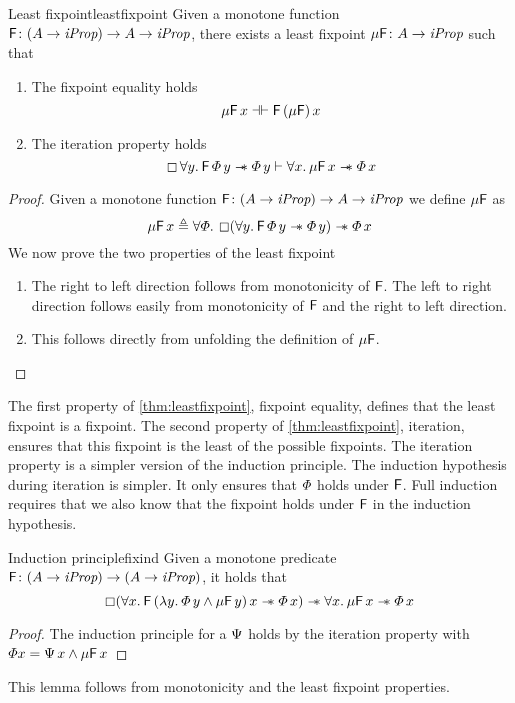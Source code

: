 \documentclass[thesis.tex]{subfiles}
\begin{document}
\begin{theorem}{Least fixpoint}{leastfixpoint}
  Given a monotone function $\textsf{\upshape F}\colon (A \to \textit{iProp}) \to  A \to \textit{iProp}$, there exists a least fixpoint $\mu\textsf{\upshape F}\colon  A \to \textit{iProp}$ such that
  \begin{enumerate}
    \item The fixpoint equality holds
          \[ \mu\textsf{\upshape F}\, x \mathrel{\dashv\vdash} \textsf{\upshape F}\, (\mu\textsf{\upshape F})\, x \]
    \item The iteration property holds
          \[ \always \All \varB. \hopred\, \pred\, \varB \wand \pred\, \varB \proves \All \var. \lfp\hopred\, \var \wand \pred\, \var \]
  \end{enumerate}
\end{theorem}
\begin{proof}
  Given a monotone function $\textsf{\upshape F}\colon (A \to \textit{iProp}) \to  A \to \textit{iProp}$ we define $\mu\textsf{\upshape F}$ as
  \[ \lfp\hopred\, \var \eqdef \All \pred. \always(\All \varB. \hopred\, \pred\, \varB \wand \pred\, \varB) \wand \pred \, \var \]
  We now prove the two properties of the least fixpoint
  \begin{enumerate}
    \item The right to left direction follows from monotonicity of $\textsf{\upshape F}$. The left to right direction follows easily from monotonicity of $\textsf{\upshape F}$ and the right to left direction.
    \item This follows directly from unfolding the definition of $\mu\textsf{\upshape F}$. \qedhere
  \end{enumerate}
\end{proof}
\noindent The first property of \cref{thm:leastfixpoint}, fixpoint equality, defines that the least fixpoint is a fixpoint. The second property of \cref{thm:leastfixpoint}, iteration, ensures that this fixpoint is the least of the possible fixpoints. The iteration property is a simpler version of the induction principle. The induction hypothesis during iteration is simpler. It only ensures that $\varPhi$ holds under $\textsf{\upshape F}$. Full induction requires that we also know that the fixpoint holds under $\textsf{\upshape F}$ in the induction hypothesis.
\begin{lemma}{Induction principle}{fixind}
  Given a monotone predicate $\textsf{\upshape F}\colon (A \to \textit{iProp}) \to (A \to \textit{iProp})$, it holds that
  \[\always(\All\var.\hopred\,(\Lam\varB. \pred\,\varB \land \lfp\hopred\,\varB)\,\var \wand \pred\,\var) \wand \All\var. \lfp\hopred\,\var \wand \pred\,\var\]
\end{lemma}
\begin{proof}
  The induction principle for a $\Psi$ holds by the iteration property with $\varPhi x = \Psi\, x \land \mu\textsf{\upshape F}\, x$
\end{proof}
This lemma follows from monotonicity and the least fixpoint properties.
\end{document}

